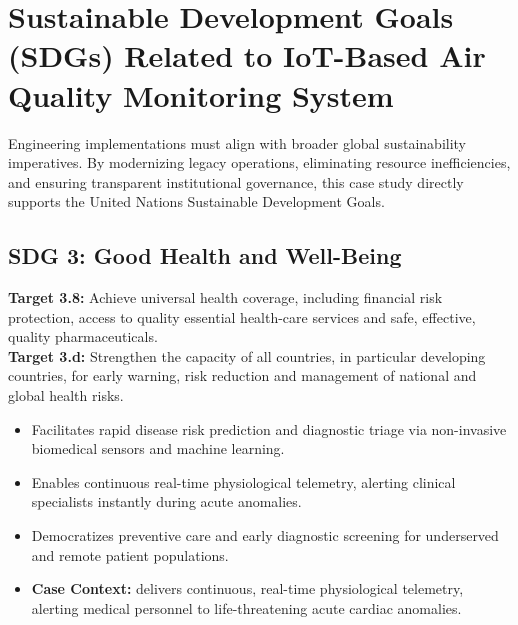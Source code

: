 \section{Sustainable Development Goals (SDGs) Related to IoT-Based Air Quality Monitoring System}
Engineering implementations must align with broader global sustainability imperatives. By modernizing legacy operations, eliminating resource inefficiencies, and ensuring transparent institutional governance, this case study directly supports the United Nations Sustainable Development Goals.

\subsection{SDG 3: Good Health and Well-Being}
\noindent\textbf{Target 3.8:} Achieve universal health coverage, including financial risk protection, access to quality essential health-care services and safe, effective, quality pharmaceuticals. \\
\noindent\textbf{Target 3.d:} Strengthen the capacity of all countries, in particular developing countries, for early warning, risk reduction and management of national and global health risks.
\begin{itemize}
  \item Facilitates rapid disease risk prediction and diagnostic triage via non-invasive biomedical sensors and machine learning.
  \item Enables continuous real-time physiological telemetry, alerting clinical specialists instantly during acute anomalies.
  \item Democratizes preventive care and early diagnostic screening for underserved and remote patient populations.
  \item \textbf{Case Context:} delivers continuous, real-time physiological telemetry, alerting medical personnel to life-threatening acute cardiac anomalies.
\end{itemize}

